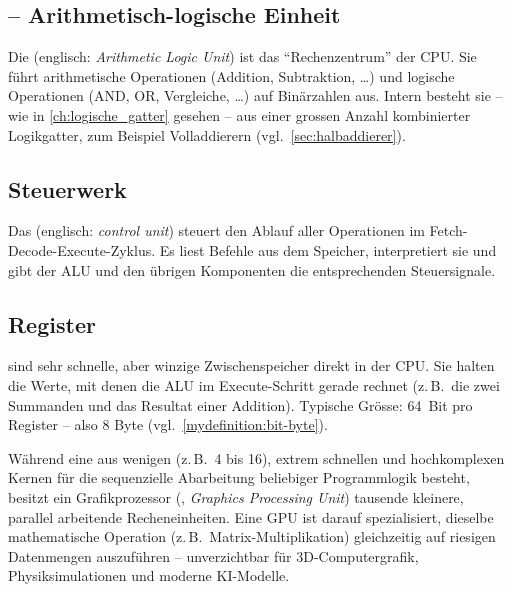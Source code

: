 \subsection{\texorpdfstring{}{ALU} -- Arithmetisch-logische Einheit}

Die  (englisch: \emph{Arithmetic Logic Unit}) ist das \enquote{Rechenzentrum} der \gls{CPU}. Sie führt arithmetische Operationen (Addition, Subtraktion, \ldots) und logische Operationen (AND, OR, Vergleiche, \ldots) auf Binärzahlen aus. Intern besteht sie -- wie in \cref{ch:logische_gatter} gesehen -- aus einer grossen Anzahl kombinierter Logikgatter, zum Beispiel Volladdierern (vgl.\ \cref{sec:halbaddierer}).

\subsection{Steuerwerk}

Das  (englisch: \emph{control unit}) steuert den Ablauf aller Operationen im Fetch-Decode-Execute-Zyklus. Es liest Befehle aus dem Speicher, interpretiert sie und gibt der \gls{ALU} und den übrigen Komponenten die entsprechenden Steuersignale.

\subsection{Register}

 sind sehr schnelle, aber winzige Zwischenspeicher direkt in der \gls{CPU}. Sie halten die Werte, mit denen die \gls{ALU} im Execute-Schritt gerade rechnet (z.\,B.\ die zwei Summanden und das Resultat einer Addition). Typische Grösse: 64~Bit pro Register -- also 8 Byte (vgl.\ \cref{mydefinition:bit-byte}).

\begin{myremark}
    Während eine  aus wenigen (z.\,B.\ 4 bis 16), extrem schnellen und hochkomplexen Kernen für die sequenzielle Abarbeitung beliebiger Programmlogik besteht, besitzt ein Grafikprozessor (, \emph{Graphics Processing Unit}) tausende kleinere, parallel arbeitende Recheneinheiten. Eine \gls{GPU} ist darauf spezialisiert, dieselbe mathematische Operation (z.\,B.\ Matrix-Multiplikation) gleichzeitig auf riesigen Datenmengen auszuführen -- unverzichtbar für 3D-Computergrafik, Physiksimulationen und moderne \gls{KI}-Modelle.
\end{myremark}

